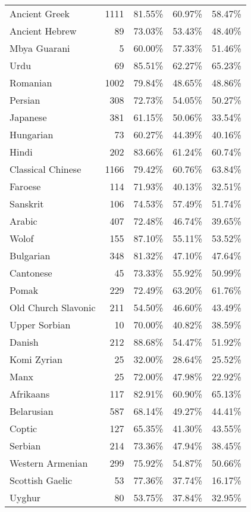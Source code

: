 \begin{longtable}{lrrrr}
    Ancient Greek & 1111 & 81.55\% & 60.97\% & 58.47\% \\
    Ancient Hebrew & 89 & 73.03\% & 53.43\% & 48.40\% \\
    Mbya Guarani & 5 & 60.00\% & 57.33\% & 51.46\% \\
    Urdu & 69 & 85.51\% & 62.27\% & 65.23\% \\
    Romanian & 1002 & 79.84\% & 48.65\% & 48.86\% \\
    Persian & 308 & 72.73\% & 54.05\% & 50.27\% \\
    Japanese & 381 & 61.15\% & 50.06\% & 33.54\% \\
    Hungarian & 73 & 60.27\% & 44.39\% & 40.16\% \\
    Hindi & 202 & 83.66\% & 61.24\% & 60.74\% \\
    Classical Chinese & 1166 & 79.42\% & 60.76\% & 63.84\% \\
    Faroese & 114 & 71.93\% & 40.13\% & 32.51\% \\
    Sanskrit & 106 & 74.53\% & 57.49\% & 51.74\% \\
    Arabic & 407 & 72.48\% & 46.74\% & 39.65\% \\
    Wolof & 155 & 87.10\% & 55.11\% & 53.52\% \\
    Bulgarian & 348 & 81.32\% & 47.10\% & 47.64\% \\
    Cantonese & 45 & 73.33\% & 55.92\% & 50.99\% \\
    Pomak & 229 & 72.49\% & 63.20\% & 61.76\% \\
    Old Church Slavonic & 211 & 54.50\% & 46.60\% & 43.49\% \\
    Upper Sorbian & 10 & 70.00\% & 40.82\% & 38.59\% \\
    Danish & 212 & 88.68\% & 54.47\% & 51.92\% \\
    Komi Zyrian & 25 & 32.00\% & 28.64\% & 25.52\% \\
    Manx & 25 & 72.00\% & 47.98\% & 22.92\% \\
    Afrikaans & 117 & 82.91\% & 60.90\% & 65.13\% \\
    Belarusian & 587 & 68.14\% & 49.27\% & 44.41\% \\
    Coptic & 127 & 65.35\% & 41.30\% & 43.55\% \\
    Serbian & 214 & 73.36\% & 47.94\% & 38.45\% \\
    Western Armenian & 299 & 75.92\% & 54.87\% & 50.66\% \\
    Scottish Gaelic & 53 & 77.36\% & 37.74\% & 16.17\% \\
    Uyghur & 80 & 53.75\% & 37.84\% & 32.95\% \\
\end{longtable}
    